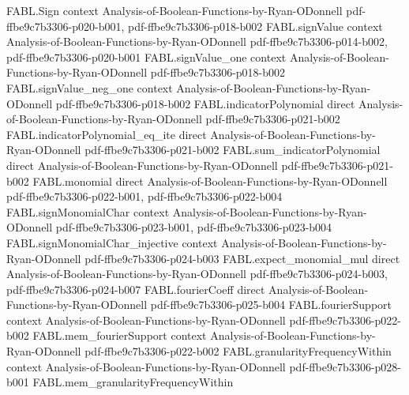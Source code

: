 \begin{theorem}
\label{FABL.variance_le_totalInfluence}
\leanok
{}
\proofstep
  {FABL.Sign}
  {context}
  {Analysis-of-Boolean-Functions-by-Ryan-ODonnell}
  {pdf-ffbe9c7b3306-p020-b001,
    pdf-ffbe9c7b3306-p018-b002}
\proofstep
  {FABL.signValue}
  {context}
  {Analysis-of-Boolean-Functions-by-Ryan-ODonnell}
  {pdf-ffbe9c7b3306-p014-b002,
    pdf-ffbe9c7b3306-p020-b001}
\proofstep
  {FABL.signValue_one}
  {context}
  {Analysis-of-Boolean-Functions-by-Ryan-ODonnell}
  {pdf-ffbe9c7b3306-p018-b002}
\proofstep
  {FABL.signValue_neg_one}
  {context}
  {Analysis-of-Boolean-Functions-by-Ryan-ODonnell}
  {pdf-ffbe9c7b3306-p018-b002}
\proofstep
  {FABL.indicatorPolynomial}
  {direct}
  {Analysis-of-Boolean-Functions-by-Ryan-ODonnell}
  {pdf-ffbe9c7b3306-p021-b002}
\proofstep
  {FABL.indicatorPolynomial_eq_ite}
  {direct}
  {Analysis-of-Boolean-Functions-by-Ryan-ODonnell}
  {pdf-ffbe9c7b3306-p021-b002}
\proofstep
  {FABL.sum_indicatorPolynomial}
  {direct}
  {Analysis-of-Boolean-Functions-by-Ryan-ODonnell}
  {pdf-ffbe9c7b3306-p021-b002}
\proofstep
  {FABL.monomial}
  {direct}
  {Analysis-of-Boolean-Functions-by-Ryan-ODonnell}
  {pdf-ffbe9c7b3306-p022-b001,
    pdf-ffbe9c7b3306-p022-b004}
\proofstep
  {FABL.signMonomialChar}
  {context}
  {Analysis-of-Boolean-Functions-by-Ryan-ODonnell}
  {pdf-ffbe9c7b3306-p023-b001,
    pdf-ffbe9c7b3306-p023-b004}
\proofstep
  {FABL.signMonomialChar_injective}
  {context}
  {Analysis-of-Boolean-Functions-by-Ryan-ODonnell}
  {pdf-ffbe9c7b3306-p024-b003}
\proofstep
  {FABL.expect_monomial_mul}
  {direct}
  {Analysis-of-Boolean-Functions-by-Ryan-ODonnell}
  {pdf-ffbe9c7b3306-p024-b003,
    pdf-ffbe9c7b3306-p024-b007}
\proofstep
  {FABL.fourierCoeff}
  {direct}
  {Analysis-of-Boolean-Functions-by-Ryan-ODonnell}
  {pdf-ffbe9c7b3306-p025-b004}
\proofstep
  {FABL.fourierSupport}
  {context}
  {Analysis-of-Boolean-Functions-by-Ryan-ODonnell}
  {pdf-ffbe9c7b3306-p022-b002}
\proofstep
  {FABL.mem_fourierSupport}
  {context}
  {Analysis-of-Boolean-Functions-by-Ryan-ODonnell}
  {pdf-ffbe9c7b3306-p022-b002}
\proofstep
  {FABL.granularityFrequencyWithin}
  {context}
  {Analysis-of-Boolean-Functions-by-Ryan-ODonnell}
  {pdf-ffbe9c7b3306-p028-b001}
\proofstep
  {FABL.mem_granularityFrequencyWithin}

\end{theorem}
